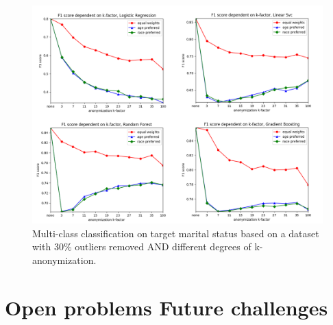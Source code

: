 \documentclass{llncs}
\begin{document}
\begin{figure}[H]
	\centering
	\includegraphics[width=1\textwidth]{figures/anon_outliers/anon_outliers_marital_combined}
	\caption{Multi-class classification on target marital status based on a dataset with 30\% outliers removed AND different degrees of k-anonymization.}
	\label{fig:results_anonymization_outliers_marital_status}
\end{figure}





\section{Open problems Future challenges}
\label{sect:op_fc}

	
	
	
\end{document}
